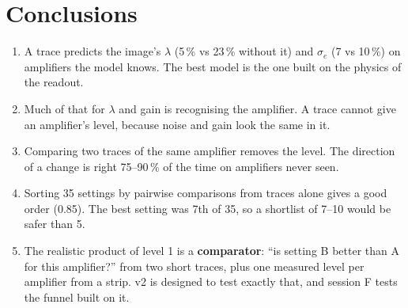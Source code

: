 \documentclass[11pt]{article}
\begin{document}
\section{Conclusions}
\begin{enumerate}[leftmargin=1.4em]
\item A trace predicts the image's $\lambda$ (5\,\% vs 23\,\% without it) and $\sigma_e$ (7 vs 10\,\%) on amplifiers
  the model knows. The best model is the one built on the physics of the readout.
\item Much of that for $\lambda$ and gain is recognising the amplifier. A trace cannot give an amplifier's level,
  because noise and gain look the same in it.
\item Comparing two traces of the same amplifier removes the level. The direction of a change is right 75--90\,\% of
  the time on amplifiers never seen.
\item Sorting 35 settings by pairwise comparisons from traces alone gives a good order (0.85). The best setting was 7th
  of 35, so a shortlist of 7--10 would be safer than 5.
\item The realistic product of level 1 is a \textbf{comparator}: ``is setting B better than A for this amplifier?'' from
  two short traces, plus one measured level per amplifier from a strip. v2 is designed to test exactly that, and session
  F tests the funnel built on it.
\end{enumerate}

\appendix
\end{document}
